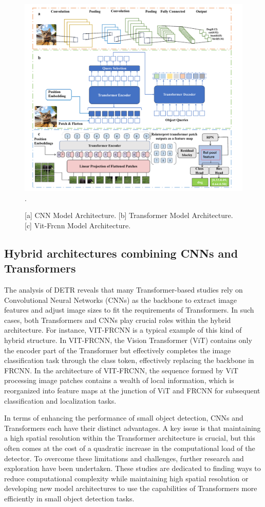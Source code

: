 \documentclass[journal]{IEEEtran}
\begin{document}
\begin{figure}[htbp]
	\centering
	\setlength{\abovecaptionskip}{-0.6cm}
	\includegraphics[width=\textwidth]{fig 2}
	\DeclareGraphicsExtensions.
	\caption{[a] CNN Model Architecture. [b] Transformer Model Architecture. [c] Vit-Frcnn Model Architecture.}
	\label{fig 1}
\end{figure}

\subsection{ Hybrid architectures combining CNNs and Transformers}
The analysis of DETR reveals that many Transformer-based studies rely on Convolutional Neural Networks (CNNs) as the backbone to extract image features and adjust image sizes to fit the requirements of Transformers. In such cases, both Transformers and CNNs play crucial roles within the hybrid architecture. For instance, VIT-FRCNN is a typical example of this kind of hybrid structure. In VIT-FRCNN, the Vision Transformer (ViT) contains only the encoder part of the Transformer but effectively completes the image classification task through the class token, effectively replacing the backbone in FRCNN. In the architecture of VIT-FRCNN, the sequence formed by ViT processing image patches contains a wealth of local information, which is reorganized into feature maps at the junction of ViT and FRCNN for subsequent classification and localization tasks.

In terms of enhancing the performance of small object detection, CNNs and Transformers each have their distinct advantages. A key issue is that maintaining a high spatial resolution within the Transformer architecture is crucial, but this often comes at the cost of a quadratic increase in the computational load of the detector. To overcome these limitations and challenges, further research and exploration have been undertaken. These studies are dedicated to finding ways to reduce computational complexity while maintaining high spatial resolution or developing new model architectures to use the capabilities of Transformers more efficiently in small object detection tasks.
\end{document}
